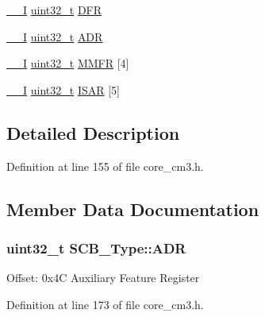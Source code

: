 \begin{DoxyCompactItemize}
\item 
\hyperlink{group___c_m_s_i_s___c_m3__core__definitions_gaf63697ed9952cc71e1225efe205f6cd3}{\+\_\+\+\_\+I} \hyperlink{_p_e___types_8h_a33594304e786b158f3fb30289278f5af}{uint32\+\_\+t} \hyperlink{struct_s_c_b___type_a586a5225467262b378c0f231ccc77f86}{D\+FR}
\item 
\hyperlink{group___c_m_s_i_s___c_m3__core__definitions_gaf63697ed9952cc71e1225efe205f6cd3}{\+\_\+\+\_\+I} \hyperlink{_p_e___types_8h_a33594304e786b158f3fb30289278f5af}{uint32\+\_\+t} \hyperlink{struct_s_c_b___type_aaedf846e435ed05c68784b40d3db2bf2}{A\+DR}
\item 
\hyperlink{group___c_m_s_i_s___c_m3__core__definitions_gaf63697ed9952cc71e1225efe205f6cd3}{\+\_\+\+\_\+I} \hyperlink{_p_e___types_8h_a33594304e786b158f3fb30289278f5af}{uint32\+\_\+t} \hyperlink{struct_s_c_b___type_a40b4fec8c296cba02baec983378cbcfd}{M\+M\+FR} \mbox{[}4\mbox{]}
\item 
\hyperlink{group___c_m_s_i_s___c_m3__core__definitions_gaf63697ed9952cc71e1225efe205f6cd3}{\+\_\+\+\_\+I} \hyperlink{_p_e___types_8h_a33594304e786b158f3fb30289278f5af}{uint32\+\_\+t} \hyperlink{struct_s_c_b___type_a84715ecbe885efa4841d594e7409ccae}{I\+S\+AR} \mbox{[}5\mbox{]}
\end{DoxyCompactItemize}


\subsection{Detailed Description}


Definition at line 155 of file core\+\_\+cm3.\+h.



\subsection{Member Data Documentation}
\subsubsection[{\texorpdfstring{A\+DR}{ADR}}]{ {\bf uint32\+\_\+t} S\+C\+B\+\_\+\+Type\+::\+A\+DR}\hypertarget{struct_s_c_b___type_aaedf846e435ed05c68784b40d3db2bf2}{}\label{struct_s_c_b___type_aaedf846e435ed05c68784b40d3db2bf2}
Offset\+: 0x4C Auxiliary Feature Register 

Definition at line 173 of file core\+\_\+cm3.\+h.

